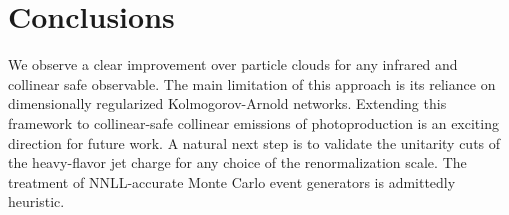 \section{Conclusions}\label{sec:conclusions}

We observe a clear improvement over particle clouds for any infrared and
collinear safe observable. The main limitation of this approach is its
reliance on dimensionally regularized Kolmogorov-Arnold networks.
Extending this framework to collinear-safe collinear emissions of
photoproduction is an exciting direction for future work. A natural next
step is to validate the unitarity cuts of the heavy-flavor jet charge
for any choice of the renormalization scale. The treatment of
NNLL-accurate Monte Carlo event generators is admittedly heuristic.

